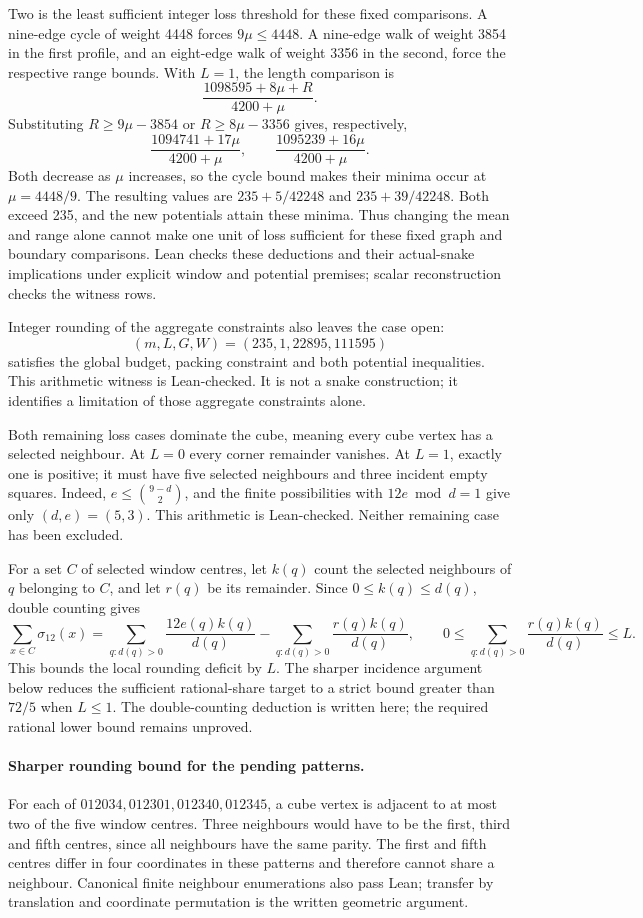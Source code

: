 \documentclass[11pt,a4paper]{article}
\begin{document}
Two is the least sufficient integer loss threshold for these fixed
comparisons. A nine-edge cycle of weight 4448 forces $9\mu\le4448$.
A nine-edge walk of weight 3854 in the first profile, and an eight-edge
walk of weight 3356 in the second, force the respective range bounds.
With $L=1$, the length comparison is
\[
\frac{1098595+8\mu+R}{4200+\mu}.
\]
Substituting $R\ge9\mu-3854$ or $R\ge8\mu-3356$ gives, respectively,
\[
\frac{1094741+17\mu}{4200+\mu},\qquad
\frac{1095239+16\mu}{4200+\mu}.
\]
Both decrease as $\mu$ increases, so the cycle bound makes their minima
occur at $\mu=4448/9$. The resulting values are
$235+5/42248$ and $235+39/42248$. Both exceed 235, and the new potentials
attain these minima. Thus changing the mean and range alone cannot make
one unit of loss sufficient for these fixed graph and boundary comparisons. Lean checks
these deductions and their actual-snake implications under explicit window
and potential premises; scalar reconstruction checks the witness rows.

Integer rounding of the aggregate constraints also leaves the case open:
\[
(m,L,G,W)=(235,1,22895,111595)
\]
satisfies the global budget, packing constraint and both potential
inequalities. This arithmetic witness is Lean-checked. It is not a
snake construction; it identifies a limitation of those aggregate
constraints alone.

Both remaining loss cases dominate the cube, meaning every cube vertex
has a selected neighbour. At $L=0$ every corner
remainder vanishes. At $L=1$, exactly one is positive; it must have
five selected neighbours and three incident empty squares. Indeed,
$e\le\binom{9-d}{2}$, and the finite possibilities with
$12e\bmod d=1$ give only $(d,e)=(5,3)$. This arithmetic is Lean-checked.
Neither remaining case has been excluded.

For a set $C$ of selected window centres, let $k(q)$ count the selected
neighbours of $q$ belonging to $C$, and let $r(q)$ be its remainder.
Since $0\le k(q)\le d(q)$, double counting gives
\[
\sum_{x\in C}\sigma_{12}(x)
=\sum_{q:d(q)>0}\frac{12e(q)k(q)}{d(q)}
-\sum_{q:d(q)>0}\frac{r(q)k(q)}{d(q)},
\qquad
0\le\sum_{q:d(q)>0}\frac{r(q)k(q)}{d(q)}\le L.
\]
This bounds the local rounding deficit by $L$. The sharper incidence
argument below reduces the sufficient rational-share target to a
strict bound greater than $72/5$ when $L\le1$. The double-counting
deduction is written here; the required rational lower bound remains unproved.

\paragraph{Sharper rounding bound for the pending patterns.}
For each of $012034,012301,012340,012345$, a cube vertex is adjacent to
at most two of the five window centres. Three neighbours would have to
be the first, third and fifth centres, since all neighbours have the same
parity. The first and fifth centres differ in four coordinates in these
patterns and therefore cannot share a neighbour. Canonical finite
neighbour enumerations also pass Lean; transfer by translation and
coordinate permutation is the written geometric argument.
\end{document}

